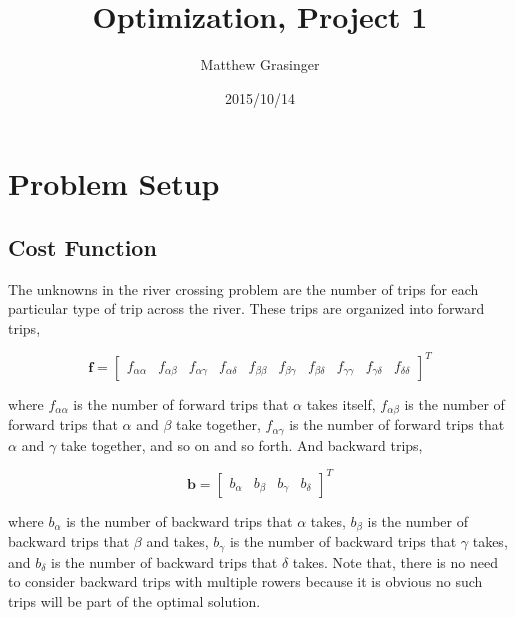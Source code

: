 \documentclass{article}
\title{Optimization, Project 1}
\date{2015/10/14}
\author{Matthew Grasinger}
\begin{document}
	
	
\maketitle
\newpage
{}

\section{Problem Setup}

\subsection{Cost Function}

The unknowns in the river crossing problem are the number of trips for each particular type of trip across the river.
These trips are organized into forward trips,

\begin{equation} \label{eq:fvec}
	\mathbf{f} = \begin{bmatrix}
		f_{\alpha \alpha} & f_{\alpha \beta} & f_{\alpha \gamma} & f_{\alpha \delta} & f_{\beta \beta} & f_{\beta \gamma} & f_{\beta \delta} & f_{\gamma \gamma} & f_{\gamma \delta} & f_{\delta \delta}
	\end{bmatrix}^T
\end{equation}

\noindent where $f_{\alpha \alpha}$ is the number of forward trips that $\alpha$ takes itself, $f_{\alpha \beta}$ is the number of forward trips that $\alpha$ and $\beta$ take together, $f_{\alpha \gamma}$ is the number of forward trips that $\alpha$ and $\gamma$ take together, and so on and so forth. And backward trips,

\begin{equation} \label{eq:bvec}
\mathbf{b} = \begin{bmatrix}
b_{\alpha} & b_{\beta} & b_{\gamma} & b_{\delta}
\end{bmatrix}^T
\end{equation}

\noindent where $b_{\alpha}$ is the number of backward trips that $\alpha$ takes, $b_{\beta}$ is the number of backward trips that $\beta$ and takes, $b_{\gamma}$ is the number of backward trips that $\gamma$ takes, and $b_{\delta}$ is the number of backward trips that $\delta$ takes.
Note that, there is no need to consider backward trips with multiple rowers because it is obvious no such trips will be part of the optimal solution.
\end{document}
